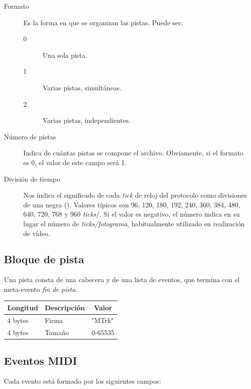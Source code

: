 \begin{description}
	\item[Formato] Es la forma en que se organizan las pistas. Puede ser:
	\begin{description}
		\item[0] Una sola pista.
		\item[1] Varias pistas, simultáneas.
		\item[2] Varias pistas, independientes.
	\end{description}
	
	\item[Número de pistas] Indica de cuántas pistas se compone el archivo. Obviamente, si el formato es 0, el valor de este campo será 1.
	
	\item[División de tiempo] Nos indica el significado de cada \textit{tick} de reloj del protocolo como divisiones de una negra (\quarternote). Valores típicos son 96, 120, 180, 192, 240, 360, 384, 480, 640, 720, 768 y 960 \textit{ticks}/\quarternote. Si el valor es negativo, el número indica en su lugar el número de \textit{ticks/fotograma}, habitualmente utilizado en realización de vídeo.
\end{description}

\subsection{Bloque de pista}

Una pista consta de una cabecera y de una lista de eventos, que termina con el meta-evento \textit{fin de pista}.

\begin{center}
	\begin{tabular}{|l|l|l|}
		\hline \multicolumn{1}{|c|}{\textbf{Longitud}} & \multicolumn{1}{c|}{\textbf{Descripción}} & \multicolumn{1}{c|}{\textbf{Valor}} \\
		\hline 4 bytes & Firma & "MTrk" \\ 
		\hline 4 bytes & Tamaño & 0-65535 \\  
		\hline 
	\end{tabular} 
\end{center}

\subsection{Eventos MIDI}

Cada evento está formado por los siguientes campos:

